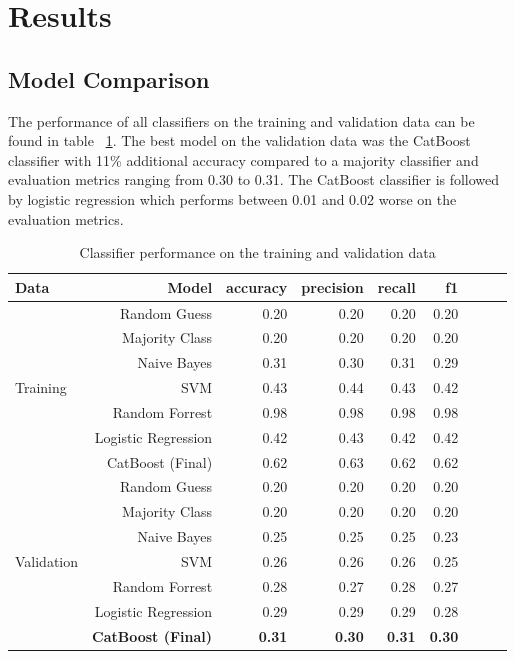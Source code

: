\documentclass{article}
\begin{document}
	
	\section{Results}
	
	\subsection{Model Comparison}

	The performance of all classifiers on the training and validation data can be found in table ~\ref{table:results_train_valid}. The best model on the validation data was the CatBoost classifier with 11\% additional accuracy compared to a majority classifier and evaluation metrics ranging from 0.30 to 0.31. The CatBoost classifier is followed  by logistic regression which performs between 0.01 and 0.02 worse on the evaluation metrics. 

	\begin{table}[h!]
		\centering
		\caption{Classifier performance on the training and validation data}
		\label{table:results_train_valid}
		
		\begin{tabular}{lrrrrrrrr}
			\toprule
			Data & Model &     accuracy &     precision &     recall &    f1 \\
			\midrule
			& Random Guess   &  0.20 &  0.20 &   0.20 &  0.20 \\
			& Majority Class &    0.20 &  0.20 &   0.20 &   0.20 \\
			& Naive Bayes       &   0.31 & 0.30 &  0.31 &  0.29 \\
			Training & SVM      &  0.43 & 0.44 & 0.43 &  0.42 \\
			& Random Forrest      &  0.98 & 0.98 & 0.98 &  0.98 \\
			& Logistic Regression   &  0.42 & 0.43 & 0.42 &  0.42 \\
			& CatBoost (Final)   &  0.62 & 0.63 &  0.62 & 0.62 \\
			\midrule
			& Random Guess   &  0.20 &  0.20 &   0.20 &  0.20 \\
			& Majority Class &    0.20 &  0.20 &   0.20 &   0.20 \\
			& Naive Bayes       &   0.25 & 0.25 &  0.25 &  0.23 \\
			Validation & SVM      &  0.26 & 0.26 & 0.26 & 0.25 \\
			& Random Forrest      &  0.28 & 0.27 & 0.28 & 0.27 \\
			& Logistic Regression   &  0.29 & 0.29 &  0.29 &  0.28 \\
			& \textbf{CatBoost (Final)}  &  \textbf{0.31} & \textbf{0.30} & \textbf{ 0.31} & \textbf{0.30} \\
			\bottomrule
		\end{tabular}
		
	\end{table}%
\end{document}
